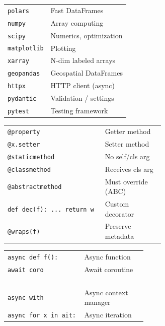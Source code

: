 \documentclass[10pt]{extarticle}
\begin{document}
\begin{multicols}{2}
\begin{tabularx}{\linewidth}{@{}l@{\enspace}Y@{}}
\texttt{polars}           & Fast DataFrames \\
\texttt{numpy}            & Array computing \\
\texttt{scipy}            & Numerics, optimization \\
\texttt{matplotlib}       & Plotting \\
\texttt{xarray}           & N-dim labeled arrays \\
\texttt{geopandas}        & Geospatial DataFrames \\
\texttt{httpx}            & HTTP client (async) \\
\texttt{pydantic}         & Validation / settings \\
\texttt{pytest}           & Testing framework \\
\end{tabularx}

\begin{tabularx}{\linewidth}{@{}>{\raggedright\arraybackslash}p{0.62\linewidth}@{\enspace}Y@{}}
\texttt{@property}                    & Getter method \\
\texttt{@x.setter}                    & Setter method \\
\texttt{@staticmethod}                & No self/cls arg \\
\texttt{@classmethod}                 & Receives cls arg \\
\texttt{@abstractmethod}              & Must override (ABC) \\
\texttt{def dec(f): ... return w}     & Custom decorator \\
\texttt{@wraps(f)}                    & Preserve metadata \\
\end{tabularx}

\begin{tabularx}{\linewidth}{@{}>{\raggedright\arraybackslash}p{0.55\linewidth}@{\enspace}Y@{}}
\texttt{async def f():}               & Async function \\
\texttt{await coro}                   & Await coroutine \\
 & \\
 \\
 & \\
 \\
\texttt{async with}                   & Async context manager \\
\texttt{async for x in ait:}          & Async iteration \\
\end{tabularx}


\end{multicols}
\end{document}

